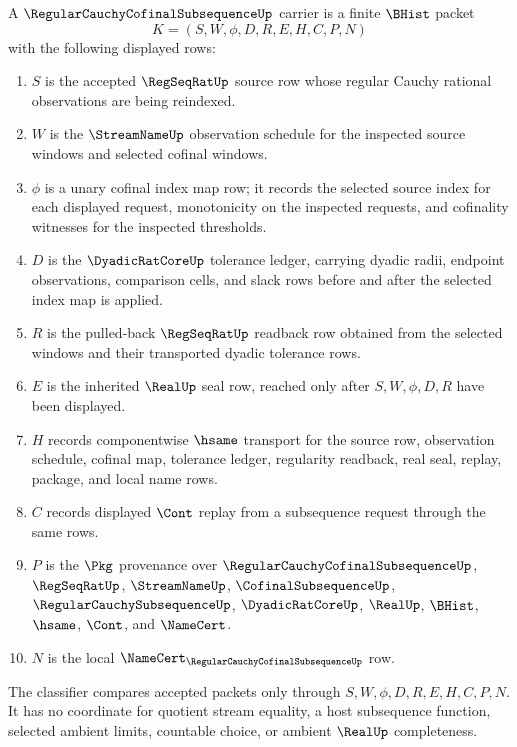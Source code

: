 \begin{definition}
\label{def:regular-cauchy-cofinal-subsequence-carrier}
A $\RegularCauchyCofinalSubsequenceUp$ carrier is a finite $\BHist$ packet
$$
K=(S,W,\phi,D,R,E,H,C,P,N)
$$
with the following displayed rows:
\begin{enumerate}
\item $S$ is the accepted $\RegSeqRatUp$ source row whose regular Cauchy rational observations are being reindexed.
\item $W$ is the $\StreamNameUp$ observation schedule for the inspected source windows and selected cofinal windows.
\item $\phi$ is a unary cofinal index map row; it records the selected source index for each displayed request, monotonicity on the inspected requests, and cofinality witnesses for the inspected thresholds.
\item $D$ is the $\DyadicRatCoreUp$ tolerance ledger, carrying dyadic radii, endpoint observations, comparison cells, and slack rows before and after the selected index map is applied.
\item $R$ is the pulled-back $\RegSeqRatUp$ readback row obtained from the selected windows and their transported dyadic tolerance rows.
\item $E$ is the inherited $\RealUp$ seal row, reached only after $S,W,\phi,D,R$ have been displayed.
\item $H$ records componentwise $\hsame$ transport for the source row, observation schedule, cofinal map, tolerance ledger, regularity readback, real seal, replay, package, and local name rows.
\item $C$ records displayed $\Cont$ replay from a subsequence request through the same rows.
\item $P$ is the $\Pkg$ provenance over $\RegularCauchyCofinalSubsequenceUp$, $\RegSeqRatUp$, $\StreamNameUp$, $\CofinalSubsequenceUp$, $\RegularCauchySubsequenceUp$, $\DyadicRatCoreUp$, $\RealUp$, $\BHist$, $\hsame$, $\Cont$, and $\NameCert$.
\item $N$ is the local $\NameCert_{\RegularCauchyCofinalSubsequenceUp}$ row.
\end{enumerate}
The classifier compares accepted packets only through $S,W,\phi,D,R,E,H,C,P,N$. It has no coordinate for quotient stream equality, a host subsequence function, selected ambient limits, countable choice, or ambient $\RealUp$ completeness.
\end{definition}

